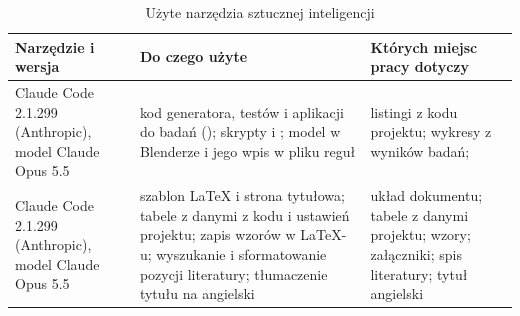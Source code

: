 \begin{table}
  \centering
  \footnotesize
  \caption{Użyte narzędzia sztucznej inteligencji}
  \label{tab:narzedzia-ai}
  \begin{tabularx}{\linewidth}{@{}>{\raggedright\arraybackslash}p{3.1cm}LL@{}}
    \toprule
    Narzędzie i wersja & Do czego użyte & Których miejsc pracy dotyczy \\
    \midrule
    Claude Code 2.1.299 (Anthropic), model Claude Opus 5.5 & kod generatora, testów i aplikacji do badań (); skrypty  i ; model  w Blenderze i jego wpis w pliku reguł & listingi z kodu projektu; wykresy z wyników badań;  \\
    \addlinespace
    Claude Code 2.1.299 (Anthropic), model Claude Opus 5.5 & szablon LaTeX i strona tytułowa; tabele z danymi z kodu i ustawień projektu; zapis wzorów w LaTeX-u; wyszukanie i sformatowanie pozycji literatury; tłumaczenie tytułu na angielski & układ dokumentu; tabele z danymi projektu; wzory; załączniki; spis literatury; tytuł angielski \\
    \bottomrule
  \end{tabularx}
\end{table}
